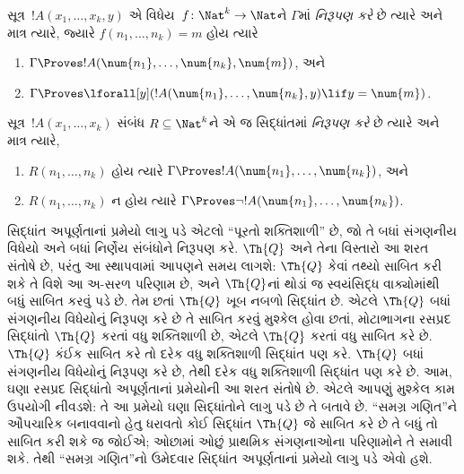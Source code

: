 \begin{defn}
સૂત્ર~$!A(x_1, \dots, x_k, y)$ એ
વિધેય~$f\colon \Nat^k \to \Nat$ને
$\Gamma$માં \emph{નિરૂપણ કરે} છે
ત્યારે અને માત્ર ત્યારે, જ્યારે
$f(n_1, \dots, n_k)=m$ હોય ત્યારે
\begin{enumerate}
\item $\Gamma \Proves !A(\num{n_1}, \dots, \num{n_k}, \num{m})$, અને
\item $\Gamma \Proves \lforall[y](!A(\num{n_1}, \dots, \num{n_k},
y) \lif y = \num{m})$.
\end{enumerate}
\end{defn}

\begin{defn}
સૂત્ર~$!A(x_1, \dots, x_k)$ સંબંધ
$R \subseteq \Nat^k$ને એ જ સિદ્ધાંતમાં
\emph{નિરૂપણ કરે}
છે ત્યારે અને માત્ર ત્યારે,
\begin{enumerate}
\item $R(n_1, \dots, n_k)$ હોય ત્યારે
  $\Gamma \Proves !A(\num{n_1},
\dots, \num{n_k})$, અને
\item $R(n_1, \dots, n_k)$ ન હોય ત્યારે
  $\Gamma \Proves \lnot
!A(\num{n_1}, \dots, \num{n_k})$.
\end{enumerate}
\end{defn}

સિદ્ધાંત અપૂર્ણતાનાં પ્રમેયો લાગુ પડે એટલો
``પૂરતો શક્તિશાળી'' છે, જો તે બધાં સંગણનીય
વિધેયો અને બધાં નિર્ણેય સંબંધોને
નિરૂપણ કરે. $\Th{Q}$ અને તેના
વિસ્તારો આ શરત સંતોષે છે, પરંતુ આ સ્થાપવામાં
આપણને સમય લાગશે: $\Th{Q}$ કેવાં તથ્યો
સાબિત કરી શકે તે વિશે આ અ-સરળ પરિણામ
છે, અને $\Th{Q}$નાં થોડાં જ સ્વયંસિદ્ધ વાક્યોમાંથી
બધું સાબિત કરવું પડે છે. તેમ છતાં
$\Th{Q}$ ખૂબ નબળો સિદ્ધાંત છે. એટલે
$\Th{Q}$ બધાં સંગણનીય વિધેયોનું
નિરૂપણ કરે છે તે સાબિત કરવું મુશ્કેલ
હોવા છતાં, મોટાભાગના રસપ્રદ સિદ્ધાંતો
$\Th{Q}$ કરતાં વધુ શક્તિશાળી છે, એટલે
$\Th{Q}$ કરતાં વધુ સાબિત કરે છે.
$\Th{Q}$ કંઈક સાબિત કરે તો દરેક વધુ
શક્તિશાળી સિદ્ધાંત પણ કરે. $\Th{Q}$
બધાં સંગણનીય વિધેયોનું નિરૂપણ કરે છે,
તેથી દરેક વધુ શક્તિશાળી સિદ્ધાંત પણ
કરે છે. આમ, ઘણા રસપ્રદ સિદ્ધાંતો
અપૂર્ણતાનાં પ્રમેયોની આ શરત સંતોષે છે.
એટલે આપણું મુશ્કેલ કામ ઉપયોગી નીવડશે:
તે આ પ્રમેયો ઘણા સિદ્ધાંતોને લાગુ પડે
છે તે બતાવે છે. ``સમગ્ર ગણિત''ને
ઔપચારિક બનાવવાનો હેતુ ધરાવતો કોઈ
સિદ્ધાંત $\Th{Q}$ જે સાબિત કરે છે
તે બધું તો સાબિત કરી શકે જ જોઈએ;
ઓછામાં ઓછું પ્રાથમિક સંગણનાઓના
પરિણામોને તે સમાવી શકે. તેથી
``સમગ્ર ગણિત''નો ઉમેદવાર સિદ્ધાંત
અપૂર્ણતાનાં પ્રમેયો લાગુ પડે એવો હશે.
\endgroup


